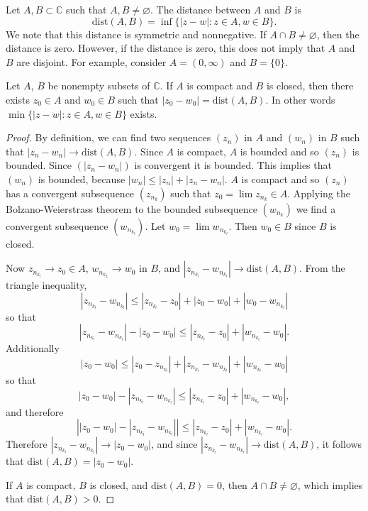 Let $A, B \subset \mathbb{C}$ such that $A, B \neq \varnothing$.
The distance between $A$ and $B$ is
$$
\mathrm{dist} (A, B) = \inf \{ |z - w| : z \in A, w \in B \}.
$$
We note that this distance is symmetric and nonnegative.
If $A \cap B \neq \varnothing$, then the distance is zero.
However, if the distance is zero, this does not imply that
$A$ and $B$ are disjoint. For example, consider $A = (0, \infty)$
and $B = \{ 0 \}$.

\begin{theorem}
  Let $A$, $B$ be nonempty subsets of $\mathbb{C}$. If $A$ is
  compact and $B$ is closed, then there exists $z_0 \in A$
  and $w_0 \in B$ such that $|z_0 - w_0| = \mathrm{dist}(A, B)$.
  In other words $\min \{ |z - w| : z \in A, w \in B \}$ exists.
\end{theorem}
\begin{proof}
  By definition, we can find two sequences
  $(z_n)$ in $A$ and $(w_n)$ in $B$
  such that $|z_n - w_n| \to \mathrm{dist}(A, B)$.
  Since $A$ is compact, $A$ is bounded and so $(z_n)$ is bounded.
  Since $(|z_n - w_n|)$ is convergent it is bounded. This implies
  that $(w_n)$ is bounded, because $|w_n| \leq |z_n| + |z_n - w_n|$.
  $A$ is compact and so $(z_n)$ has a convergent subsequence
  $(z_{n_k})$ such that $z_0 = \lim z_{n_k} \in A$. Applying the
  Bolzano-Weierstrass theorem to the bounded subsequence $(w_{n_k})$
  we find a convergent subsequence $(w_{n_{k_l}})$. Let
  $w_0 = \lim w_{n_{k_l}}$. Then $w_0 \in B$ since $B$ is closed.

  Now $z_{n_{k_l}} \to z_0 \in A$, $w_{n_{k_L}} \to w_0$ in $B$,
  and $|z_{n_{k_l}} - w_{n_{k_l}}| \to \mathrm{dist}(A, B)$.
  From the triangle inequality,
  $$
       |z_{n_{k_l}} - w_{n_{k_l}}|
  \leq |z_{n_{k_l}} - z_0| + |z_0 - w_0| + |w_0 - w_{n_{k_l}}|
  $$
  so that
  $$
       |z_{n_{k_l}} - w_{n_{k_l}}| - |z_0 - w_0|
  \leq |z_{n_{k_l}} - z_0| + |w_{n_{k_l}} - w_0|.
  $$
  Additionally
  $$
       |z_0 - w_0|
  \leq |z_0 - z_{n_{k_l}}| + |z_{n_{k_l}} - w_{n_{k_l}}| + |w_{n_{k_l}} - w_0|
  $$
  so that
  $$
       |z_0 - w_0| - |z_{n_{k_l}} - w_{n_{k_l}}|
  \leq |z_{n_{k_l}} - z_0| + |w_{n_{k_l}} - w_0|,
  $$
  and therefore
  $$
  \left||z_0 - w_0| - |z_{n_{k_l}} - w_{n_{k_l}}|\right|
  \leq |z_{n_{k_l}} - z_0| + |w_{n_{k_l}} - w_0|.
  $$
  Therefore $|z_{n_{k_l}} - w_{n_{k_l}}| \to |z_0 - w_0|$,
  and since $|z_{n_{k_l}} - w_{n_{k_l}}| \to \mathrm{dist}(A, B)$,
  it follows that $\mathrm{dist}(A, B) = |z_0 - w_0|$.

  If $A$ is compact, $B$ is closed, and $\mathrm{dist}(A,B) = 0$,
  then $A \cap B \neq \varnothing$, which implies that
  $\mathrm{dist}(A, B) > 0$.
\end{proof}

